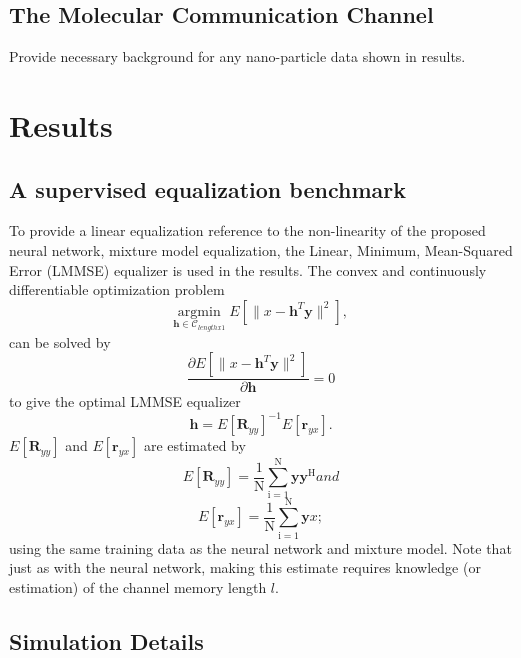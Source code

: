 \documentclass[12pt,a4paper]{article}
\begin{document}
\subsection{The Molecular Communication Channel}
Provide necessary background for any nano-particle data shown in results. 



\section{Results}
\subsection{A supervised equalization benchmark}
To provide a linear equalization reference to the non-linearity of the proposed neural network, mixture model equalization, the Linear, Minimum, Mean-Squared Error (LMMSE) equalizer is used in the results. 
The convex and continuously differentiable optimization problem 
\begin{equation*}\label{mmse}
\underset{\mathbf{\mathbf{h}} \in \textit{$\mathcal{C}_{lengthx1}$}}{\text{argmin}} \;
 E[\|x-\mathbf{h}^T\mathbf{y}\|^2],
\end{equation*}
can be solved by 
\begin{equation*}\label{mmse}
\frac{\partial  E[\|x-\mathbf{h}^T\mathbf{y}\|^2]}{\partial \mathbf{h} } = 0
\end{equation*}
to give the optimal LMMSE equalizer
\begin{equation*}\label{mmse}
\mathbf{h} = E[\mathbf{R}_{yy}]^{-1}E[\mathbf{r}_{yx}].
\end{equation*}
$E[\mathbf{R}_{yy}]$ and $E[\mathbf{r}_{yx}]$ are estimated by
\begin{equation*}\label{mmse}
 E[\mathbf{R}_{yy}]= \frac{1}{\mathrm{N}}\sum_{\mathrm{i=1}}^{\mathrm{N}}
\mathbf{y}\mathbf{y^{\mathrm{H}}} and
 \end{equation*}
\begin{equation*}\label{mmse}
E[\mathbf{r}_{yx}]= \frac{1}{\mathrm{N}}\sum_{\mathrm{i=1}}^{\mathrm{N}}
\mathbf{y}x
;
 \end{equation*}
 using the same training data as the neural network and mixture model. 
Note that just as with the neural network, making this estimate requires knowledge (or estimation) of the channel memory length $l$.


\subsection{Simulation Details}
\end{document}
